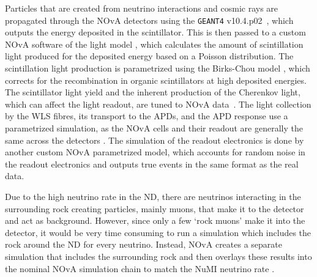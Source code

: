 Particles that are created from neutrino interactions and cosmic rays are propagated through the \gls{NOvA} detectors using the \texttt{GEANT4} v10.4.p02~\cite{GEANT4.pdf}, which outputs the energy deposited in the scintillator. This is then passed to a custom \gls{NOvA} software of the light model \cite{NuMIFlux.pdf}, which calculates the amount of scintillation light produced for the deposited energy based on a Poisson distribution. The scintillation light production is parametrized using the Birks-Chou model \cite{BirksChouParametrization_1952.pdf}, which corrects for the recombination in organic scintillators at high deposited energies. The scintillator light yield and the inherent production of the Cherenkov light, which can affect the light readout, are tuned to \gls{NOvA} data~\cite{NOvANumuCCXSexMeasurement2023.pdf}. The light collection by the \gls{WLS} fibres, its transport to the \glspl{APD}, and the \gls{APD} response use a parametrized simulation, as the \gls{NOvA} cells and their readout are generally the same across the detectors \cite{NuMIFlux.pdf}. The simulation of the readout electronics is done by another custom \gls{NOvA} parametrized model, which accounts for random noise in the readout electronics and outputs true events in the same format as the real data.


Due to the high neutrino rate in the \gls{ND}, there are neutrinos interacting in the surrounding rock creating particles, mainly muons, that make it to the detector and act as background. However, since only a few `rock muons' make it into the detector, it would be very time consuming to run a simulation which includes the rock around the \gls{ND} for every neutrino. Instead, \gls{NOvA} creates a separate simulation that includes the surrounding rock and then overlays these results into the nominal \gls{NOvA} simulation chain to match the \gls{NuMI} neutrino rate \cite{NuMIFlux.pdf}.

